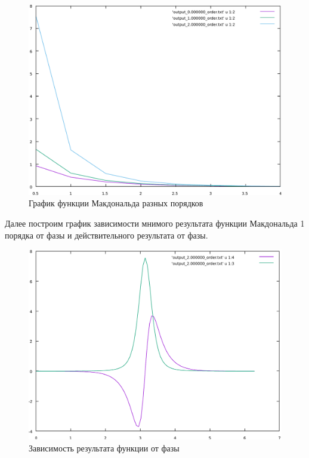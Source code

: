 \documentclass[a4paper,14pt]{extarticle}
\begin{document}
\begin{figure}[H]
	\includegraphics[height=\textwidth, width=\textwidth]{include/macd_2.pdf}
	\caption{График функции Макдональда разных порядков}
\end{figure}

\newpage

Далее построим график зависимости мнимого результата функции Макдональда 1 порядка от фазы и действительного результата от фазы.

\begin{figure}[H]
	\includegraphics[height=\textwidth, width=\textwidth]{include/mnim_macd.pdf}
	\caption{Зависимость результата функции от фазы}
\end{figure}
\end{document}

